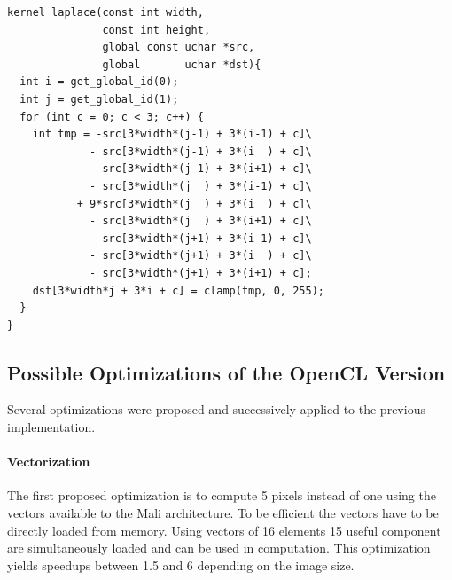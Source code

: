 \documentclass[11pt, a4paper, twoside]{montblanc}
\begin{document}
\begin{lstlisting}
kernel laplace(const int width,
               const int height,
               global const uchar *src,
               global       uchar *dst){
  int i = get_global_id(0);
  int j = get_global_id(1);
  for (int c = 0; c < 3; c++) {
    int tmp = -src[3*width*(j-1) + 3*(i-1) + c]\
             - src[3*width*(j-1) + 3*(i  ) + c]\
             - src[3*width*(j-1) + 3*(i+1) + c]\
             - src[3*width*(j  ) + 3*(i-1) + c]\
           + 9*src[3*width*(j  ) + 3*(i  ) + c]\
             - src[3*width*(j  ) + 3*(i+1) + c]\
             - src[3*width*(j+1) + 3*(i-1) + c]\
             - src[3*width*(j+1) + 3*(i  ) + c]\
             - src[3*width*(j+1) + 3*(i+1) + c];
    dst[3*width*j + 3*i + c] = clamp(tmp, 0, 255);
  }
}
\end{lstlisting}



\subsection{Possible Optimizations of the OpenCL Version}

Several optimizations were proposed and successively applied to the previous
implementation.

\paragraph{Vectorization}
The first proposed optimization is to compute 5 pixels instead of one using the
vectors available to the Mali architecture. To be efficient the vectors have to
be directly loaded from memory. Using vectors of 16 elements 15 useful component
are simultaneously loaded and can be used in computation. This optimization
yields speedups between 1.5 and 6 depending on the image size.
\end{document}

